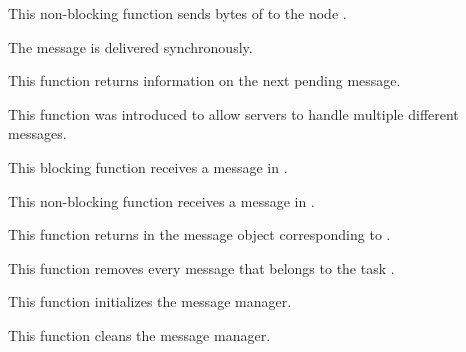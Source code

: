 	 {
	   This non-blocking function sends  bytes of
	    to the node .

	   The message is delivered synchronously.
	 }

	 {
	   This function returns information on the next pending message.

	   This function was introduced to allow servers to handle
	   multiple different messages.
	 }

	 {
	   This blocking function receives a message in .
	 }

	 {
	   This non-blocking function receives a message in .
	 }

	 {
	   This function returns in  the message object
	   corresponding to .
	 }

	 {
	   This function removes every message that belongs to the task
	   .
	 }

	 {
	   This function initializes the message manager.
	 }

	 {
	   This function cleans the message manager.
	 }

